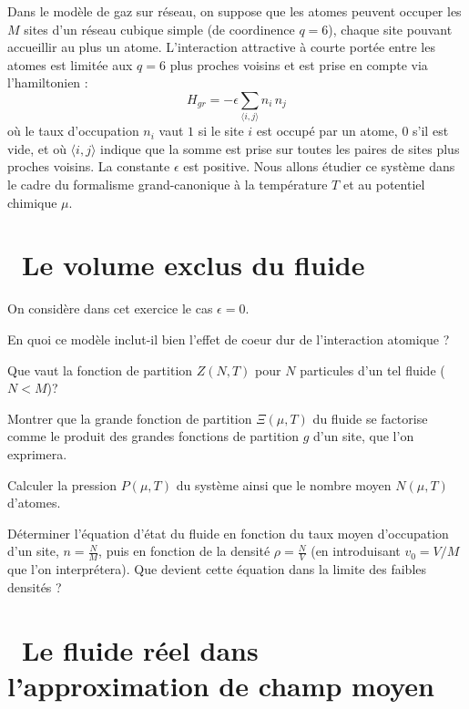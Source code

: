 \documentclass[utf8, 11pt]{feuille}
\begin{document}



Dans le modèle de gaz sur réseau, on suppose que les atomes peuvent occuper les $M$ sites d'un réseau cubique simple (de coordinence $q=6$), chaque site pouvant accueillir au plus un atome. L'interaction attractive à courte portée entre les atomes est limitée aux $q=6$ plus proches voisins et est prise en compte via l'hamiltonien :
$$
H_{gr}=-\epsilon \sum_{\langle i,j\rangle} n_i\, n_j
$$
où le taux d'occupation $n_i$ vaut $1$ si le site $i$ est occupé par un atome, $0$ s'il est vide, et où ${\langle i,j\rangle}$ indique que la somme est prise sur toutes les paires de sites plus proches voisins. La constante $\epsilon$ est positive.  Nous allons étudier ce système dans le cadre du formalisme grand-canonique à la température $T$ et au potentiel chimique $\mu$.

\section{\medium~Le volume exclus du fluide}

On considère dans cet exercice le cas $\epsilon=0$.

\medskip

\question
En quoi ce modèle inclut-il bien l'effet de coeur dur de l'interaction atomique ?
 
\question
Que vaut la fonction de partition $Z(N,T)$ pour $N$ particules d'un tel fluide  ($N<M$)?

\question
Montrer que la grande fonction de partition $\Xi(\mu,T)$ du fluide se factorise comme le produit des grandes fonctions de partition $g$ d'un site, que l'on exprimera.

\question
Calculer la pression $P(\mu,T)$ du système ainsi que le nombre moyen $N(\mu,T)$ d'atomes. 

\question
Déterminer l'équation d'état du fluide en fonction du taux moyen d'occupation d'un site, $n=\frac{N}{M}$, puis en fonction de la densité $\rho=\frac{N}{V}$ (en introduisant $v_0=V/M$ que l'on interprétera).  Que devient cette équation dans la limite des faibles densités ?



\section{\medium~Le fluide réel dans l'approximation de champ moyen}
\end{document}
